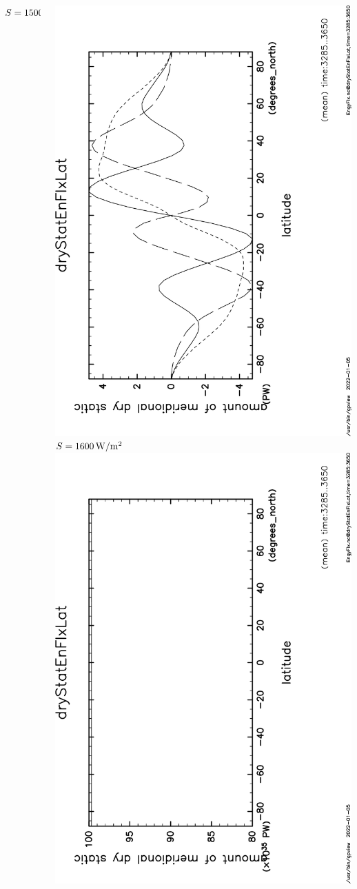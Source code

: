 \documentclass[aspectratio=149,9pt,fleqn]{beamer}
\begin{document}
\begin{frame}
\begin{columns}[T]
\begin{column}{.3\textwidth}
			\(S=1500\hmu{W/m^2}\)
		\end{column}
		\begin{column}{.3\textwidth}
			\centering
			\includegraphics[height=\textwidth,angle=-90]{S1600/EngyFlx,time=3285:3650-crop.pdf}
			\(S=1600\hmu{W/m^2}\)\\
			\includegraphics[height=\textwidth,angle=-90]{S1800/EngyFlx,time=3285:3650-crop.pdf}

\end{column}
\end{columns}
\end{frame}
\end{document}
